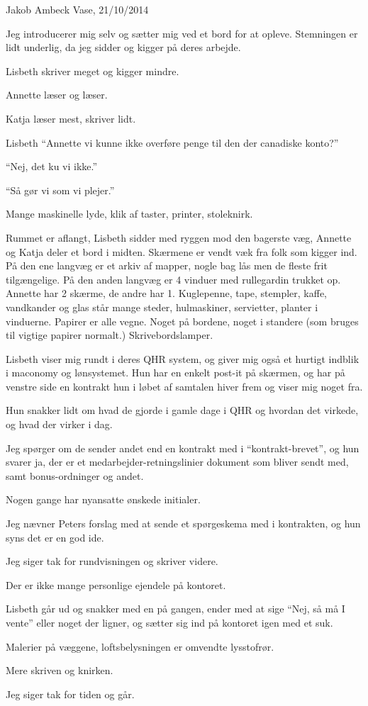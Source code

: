\begin{linenumbers*}
Jakob Ambeck Vase, 21/10/2014

Jeg introducerer mig selv og sætter mig ved et bord for at opleve. Stemningen er lidt underlig, da jeg sidder og kigger på deres arbejde.

Lisbeth skriver meget og kigger mindre.

Annette læser og læser.

Katja læser mest, skriver lidt.

Lisbeth “Annette vi kunne ikke overføre penge til den der canadiske konto?”

“Nej, det ku vi ikke.”

“Så gør vi som vi plejer.”

Mange maskinelle lyde, klik af taster, printer, stoleknirk.

Rummet er aflangt, Lisbeth sidder med ryggen mod den bagerste væg, Annette og Katja deler et bord i midten. Skærmene er vendt væk fra folk som kigger ind. På den ene langvæg er et arkiv af mapper, nogle bag lås men de fleste frit tilgængelige. På den anden langvæg er 4 vinduer med rullegardin trukket op. Annette har 2 skærme, de andre har 1. Kuglepenne, tape, stempler, kaffe, vandkander og glas står mange steder, hulmaskiner, servietter, planter i vinduerne. Papirer er alle vegne. Noget på bordene, noget i standere (som bruges til vigtige papirer normalt.) Skrivebordslamper.

Lisbeth viser mig rundt i deres QHR system, og giver mig også et hurtigt indblik i maconomy og lønsystemet. Hun har en enkelt post-it på skærmen, og har på venstre side en kontrakt hun i løbet af samtalen hiver frem og viser mig noget fra.

Hun snakker lidt om hvad de gjorde i gamle dage i QHR og hvordan det virkede, og hvad der virker i dag.

Jeg spørger om de sender andet end en kontrakt med i “kontrakt-brevet”, og hun svarer ja, der er et medarbejder-retningslinier dokument som bliver sendt med, samt bonus-ordninger og andet.

Nogen gange har nyansatte ønskede initialer.

Jeg nævner Peters forslag med at sende et spørgeskema med i kontrakten, og hun syns det er en god ide.

Jeg siger tak for rundvisningen og skriver videre.

Der er ikke mange personlige ejendele på kontoret.

Lisbeth går ud og snakker med en på gangen, ender med at sige “Nej, så må I vente” eller noget der ligner, og sætter sig ind på kontoret igen med et suk.

Malerier på væggene, loftsbelysningen er omvendte lysstofrør.

Mere skriven og knirken.

Jeg siger tak for tiden og går.
\end{linenumbers*}
